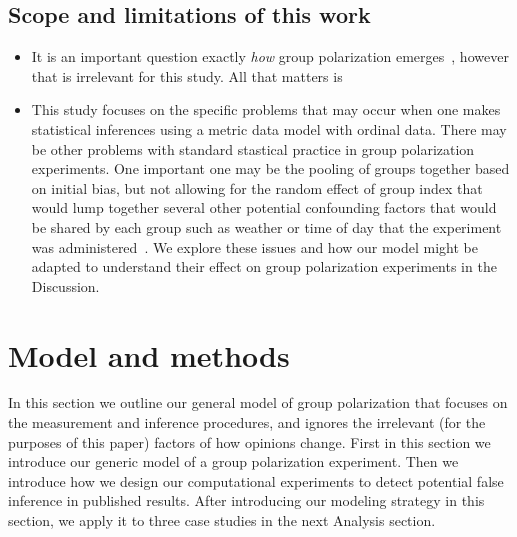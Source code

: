 \documentclass[11pt,letterpaper]{article}
\begin{document}
\subsection{Scope and limitations of this work}
  \begin{itemize}
    \item
      It is an important question exactly \emph{how} group polarization
      emerges~\cite{Sunstein2009,Turner2020}, 
      however that is irrelevant for this study. All that matters is 
    \item
      This study focuses on the specific problems that may occur when
      one makes statistical inferences using a metric data model with 
      ordinal data. There may be other problems with standard stastical
      practice in group polarization experiments. One important one may be
      the pooling of groups together based on initial bias, but not allowing
      for the random effect of group index that would lump together several
      other potential confounding factors that would be shared by each group
      such as weather or time of day that the experiment was administered~\cite{Clark1973,Baayen2008}.
      We explore these issues and how our model might be adapted to understand
      their effect on group polarization experiments in the Discussion.
  \end{itemize}


\section{Model and methods}

In this section we outline our general model of group polarization that focuses
on the measurement and inference procedures, and ignores the irrelevant
(for the purposes of this paper) factors of how opinions change. First in this
section we introduce our generic model of a group polarization experiment.
Then we introduce how we design our computational experiments to detect potential
false inference in published results. 
After introducing our modeling strategy in this section, we apply it
to three case studies in the next Analysis section.
\end{document}
